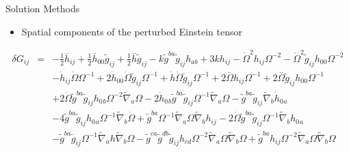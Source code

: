 \documentclass[8pt,aspectratio=1610]{beamer}
\begin{document}

\begin{frame}{Solution Methods}
	\begin{itemize}
		\item Spatial components of the perturbed Einstein tensor
	\end{itemize}
	\begin{eqnarray}
		\delta G_{ij} &=& - \tfrac{1}{2} \overset{..}{h}_{ij} + \tfrac{1}{2} \overset{..}{h}_{00}{} \tilde{g}_{ij} + \tfrac{1}{2} \overset{..}{h} \tilde{g}_{ij} -  k \tilde{g}^{ba} \tilde{g}_{ij} h_{ab} + 3 k h_{ij} -  \dot{\Omega}^2 h_{ij} \Omega^{-2} -  \dot{\Omega}^2 \tilde{g}_{ij} h_{00}{} \Omega^{-2} 
		\nonumber\\
		&& -  \dot{h}_{ij} \dot{\Omega} \Omega^{-1}  + 2 \dot{h}_{00}{} \dot{\Omega} \tilde{g}_{ij} \Omega^{-1} + \dot{h} \dot{\Omega} \tilde{g}_{ij} \Omega^{-1} + 2 \overset{..}{\Omega} h_{ij} \Omega^{-1} + 2 \overset{..}{\Omega} \tilde{g}_{ij} h_{00}{} \Omega^{-1} 
		\nonumber\\
		&& + 2 \dot{\Omega} \tilde{g}^{ba} \tilde{g}_{ij} h_{0}{}_{b} \Omega^{-2} \tilde{\nabla}_{a}\Omega  - 2 \dot{h}_{0}{}_{b} \tilde{g}^{ba} \tilde{g}_{ij} \Omega^{-1} \tilde{\nabla}_{a}\Omega -  \tilde{g}^{ba} \tilde{g}_{ij} \tilde{\nabla}_{b}\dot{h}_{0}{}_{a} 
		\nonumber\\
		&& - 4 \tilde{g}^{ba} \tilde{g}_{ij} h_{0}{}_{a} \Omega^{-1} \tilde{\nabla}_{b}\dot{\Omega} + \tilde{g}^{ba} \Omega^{-1} \tilde{\nabla}_{a}\Omega \tilde{\nabla}_{b}h_{ij} - 2 \dot{\Omega} \tilde{g}^{ba} \tilde{g}_{ij} \Omega^{-1} \tilde{\nabla}_{b}h_{0}{}_{a}
		\nonumber\\
		&&  -  \tilde{g}^{ba} \tilde{g}_{ij} \Omega^{-1} \tilde{\nabla}_{a}h \tilde{\nabla}_{b}\Omega -  \tilde{g}^{ca} \tilde{g}^{db} \tilde{g}_{ij} h_{cd} \Omega^{-2} \tilde{\nabla}_{a}\Omega \tilde{\nabla}_{b}\Omega  + \tilde{g}^{ba} h_{ij} \Omega^{-2} \tilde{\nabla}_{a}\Omega \tilde{\nabla}_{b}\Omega 
		\nonumber\\

\end{eqnarray}
\end{frame}
\end{document}
